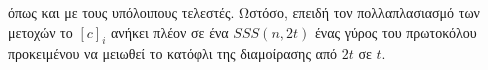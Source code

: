      όπως και με τους υπόλοιπους τελεστές. Ωστόσο, επειδή τον πολλαπλασιασμό των μετοχών το $[c]_i$ ανήκει πλέον σε ένα $SSS(n, 2t)$  ένας γύρος του πρωτοκόλου προκειμένου να μειωθεί το κατόφλι της διαμοίρασης από $2t$ σε $t$. 
     
    
    
    
    
